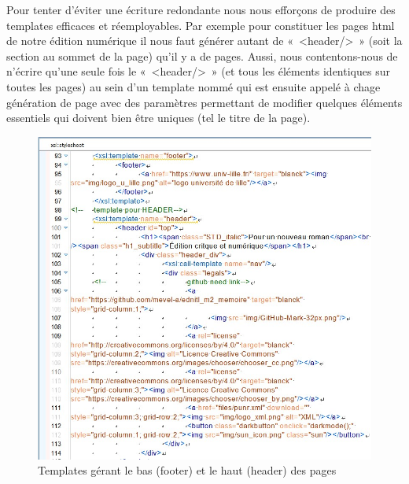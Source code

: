 \documentclass[12pt, a4paper]{article}
\begin{document}
Pour tenter d'éviter une écriture redondante nous nous efforçons de produire des templates efficaces et réemployables. Par exemple pour constituer les pages html de notre édition numérique il nous faut générer autant de «~<header/>~» (soit la section au sommet de la page) qu'il y a de pages. Aussi, nous contentons-nous de n'écrire qu'une seule fois le «~<header/>~» (et tous les éléments identiques sur toutes les pages) au sein d'un template nommé qui est ensuite appelé à chage génération de page avec des paramètres permettant de modifier quelques éléments essentiels qui doivent bien être uniques (tel le titre de la page).
\begin{figure}[H]
    \centering
    \includegraphics[scale=0.5]{img/screen_header.jpg}
    \caption{Templates gérant le bas (footer) et le haut (header) des pages}
    \label{fig:enter-label}
\end{figure}
\end{document}
